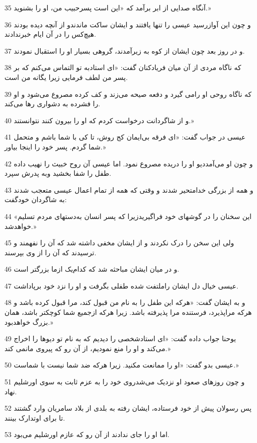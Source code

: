 \par 35 آنگاه صدایی از ابر برآمد که «این است پسرحبیب من، او را بشنوید.»
\par 36 و چون این آوازرسید عیسی را تنها یافتند و ایشان ساکت ماندندو از آنچه دیده بودند هیچ‌کس را در آن ایام خبرندادند.
\par 37 و در روز بعد چون ایشان از کوه به زیرآمدند، گروهی بسیار او را استقبال نمودند.
\par 38 که ناگاه مردی از آن میان فریادکنان گفت: «ای استادبه تو التماس می‌کنم که بر پسر من لطف فرمایی زیرا یگانه من است.
\par 39 که ناگاه روحی او رامی گیرد و دفعه صیحه می‌زند و کف کرده مصروع می‌شود و او را فشرده به دشواری رها می‌کند.
\par 40 و از شاگردانت درخواست کردم که او را بیرون کنند نتوانستند.»
\par 41 عیسی در جواب گفت: «ای فرقه بی‌ایمان کج روش، تا کی با شما باشم و متحمل شما گردم. پسر خود را اینجا بیاور.»
\par 42 و چون او می‌آمددیو او را دریده مصروع نمود. اما عیسی آن روح خبیث را نهیب داده طفل را شفا بخشید وبه پدرش سپرد.
\par 43 و همه از بزرگی خدامتحیر شدند و وقتی که همه از تمام اعمال عیسی متعجب شدند به شاگردان خودگفت:
\par 44 «این سخنان را در گوشهای خود فراگیریدزیرا که پسر انسان به‌دستهای مردم تسلیم خواهدشد.»
\par 45 ولی این سخن را درک نکردند و از ایشان مخفی داشته شد که آن را نفهمند و ترسیدند که آن را از وی بپرسند.
\par 46 و در میان ایشان مباحثه شد که کدام‌یک ازما بزرگتر است.
\par 47 عیسی خیال دل ایشان راملتفت شده طفلی بگرفت و او را نزد خود برپاداشت.
\par 48 و به ایشان گفت: «هر‌که این طفل را به نام من قبول کند، مرا قبول کرده باشد و هر‌که مراپذیرد، فرستنده مرا پذیرفته باشد. زیرا هر‌که ازجمیع شما کوچکتر باشد، همان بزرگ خواهدبود.»
\par 49 یوحنا جواب داده گفت: «ای استادشخصی را دیدیم که به نام تو دیوها را اخراج می‌کند و او را منع نمودیم، از آن رو که پیروی مانمی کند.»
\par 50 عیسی بدو گفت: «او را ممانعت مکنید. زیرا هر‌که ضد شما نیست با شماست.»
\par 51 و چون روزهای صعود او نزدیک می‌شدروی خود را به عزم ثابت به سوی اورشلیم نهاد.
\par 52 پس رسولان پیش از خود فرستاده، ایشان رفته به بلدی از بلاد سامریان وارد گشتند تا برای اوتدارک بینند.
\par 53 اما او را جای ندادند از آن رو که عازم اورشلیم می‌بود.
